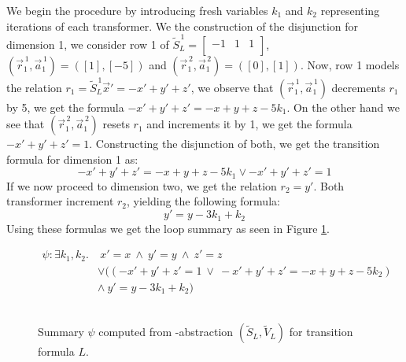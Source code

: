 We begin the procedure by introducing fresh variables $k_1$ and $k_2$ representing iterations of each transformer. We the construction of the disjunction for dimension 1, we consider row 1 of $\tilde{S}_L^{\, 1} = 	\begin{bmatrix}
	-1 & 1 & 1 \\
\end{bmatrix}$, $(\vec{r}^{\, 1}_1, \vec{a}^{\, 1}_1) = ([1], [-5])$ and $(\vec{r}^{\, 2}_1, \vec{a}^{\, 2}_1) = ([0], [1])$. Now, row 1 models the relation $ r_1 = \tilde{S}_L^{\, 1}\vec{x}' = -x' + y' + z'$, we observe that $(\vec{r}^{\, 1}_1, \vec{a}^{\, 1}_1)$ decrements $r_1$ by 5, we get the formula $-x' + y' + z' = -x + y + z - 5k_1$. On the other hand we see that $(\vec{r}^{\, 2}_1, \vec{a}^{\, 2}_1)$ resets $r_1$ and increments it by 1, we get the formula $-x' + y' + z' = 1$. Constructing the disjunction of both, we get the transition formula for dimension 1 as:
\begin{equation*}
	 -x' + y' + z' = -x + y + z - 5k_1 \lor -x' + y' + z' = 1
\end{equation*}
If we now proceed to dimension two, we get the relation $r_ 2 = y'$. Both transformer increment $r_2$, yielding the following formula:
\begin{equation*}
	y' = y - 3k_1 + k_2
\end{equation*}
Using these formulas we get the loop summary as seen in Figure \ref{loopSummary}.
\begin{figure}[H]
	\begin{align*}
		\psi: \exists k_1, k_2.&\ x' = x\ \land\ y' = y\ \land\ z' = z \\ &\lor ((-x' + y' + z' = 1\ \lor\ -x' + y' + z' = -x + y + z - 5k_2)\ \\ & \land\ y' = y - 3k_1 + k_2)\
	\end{align*}
	\caption{\\ Summary $\psi$ computed from \qvasr-abstraction $(\tilde{S}_L, \tilde{V}_L)$ for transition formula $L$.}
	\label{loopSummary}
\end{figure}

